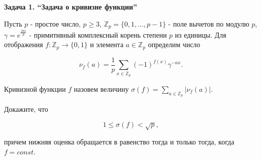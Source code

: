 \documentclass{article}
\newcommand{\ZZ}{\mathbb{Z}}
\begin{document}
\begin{center}
    \Huge\textbf{Задача 1. ``Задача о кривизне функции''}
\end{center}

Пусть $p$ - простое число, $p \geqslant 3$, $\ZZ_p = \{ 0, 1, \ldots, p - 1 \}$ - поле вычетов по модулю $p$, $\gamma = e^{\frac{2\pi i}{p}}$ - примитивный комплексный корень степени $p$ из единицы. Для отображения $f : \ZZ_p \to \{ 0, 1 \}$ и элемента $a \in \ZZ_p$ определим число

\begin{equation*}
    \nu_f(a) = \dfrac{1}{p} \sum_{x \in \ZZ_p} (-1)^{f(x)} \gamma^{-ax}.
\end{equation*}

Кривизной функции $f$ назовем величину $\sigma(f) = \displaystyle{\sum_{a \in \ZZ_p}} \lvert \nu_f(a) \rvert$.

Докажите, что

\begin{equation*}
    1 \leqslant \sigma(f) < \sqrt{p},
\end{equation*}

причем нижняя оценка обращается в равенство тогда и только тогда, когда $f = const$.




\end{document}
